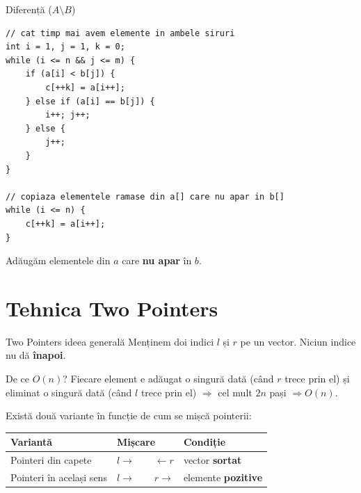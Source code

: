 \documentclass{beamer}
\begin{document}
\begin{frame}[fragile]{Diferență ($A \setminus B$)}
  \begin{lstlisting}
// cat timp mai avem elemente in ambele siruri
int i = 1, j = 1, k = 0;
while (i <= n && j <= m) {
    if (a[i] < b[j]) {
        c[++k] = a[i++];
    } else if (a[i] == b[j]) {
        i++; j++;
    } else {
        j++;
    }
}

// copiaza elementele ramase din a[] care nu apar in b[]
while (i <= n) {
    c[++k] = a[i++];
}
  \end{lstlisting}
  Adăugăm elementele din $a$ care \textbf{nu apar} în $b$.
\end{frame}

\section{Tehnica Two Pointers}

\begin{frame}{Two Pointers \textemdash{} ideea generală}
  Menținem doi indici $l$ și $r$ pe un vector. Niciun indice nu dă \textbf{înapoi}.

  \begin{block}{De ce $O(n)$?}
    Fiecare element e adăugat o singură dată (când $r$ trece prin el)
    și eliminat o singură dată (când $l$ trece prin el) $\Rightarrow$ cel mult $2n$ pași $\Rightarrow O(n)$.
  \end{block}

  \smallskip
  Există două variante în funcție de cum se mișcă pointerii:

  \begin{center}
  \begin{tabular}{lll}
    \toprule
    Variantă & Mișcare & Condiție \\
    \midrule
    Pointeri din capete      & $l \to\qquad\leftarrow r$ & vector \textbf{sortat} \\
    Pointeri în același sens & $l \to\qquad r \to$       & elemente \textbf{pozitive} \\
    \bottomrule
  \end{tabular}
  \end{center}
\end{frame}
\end{document}
